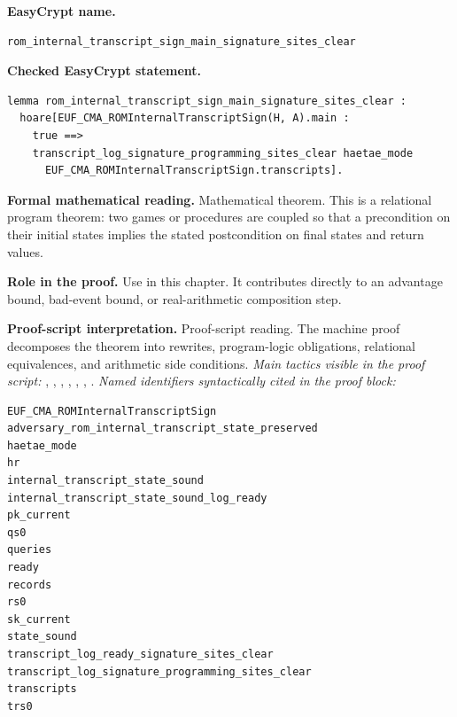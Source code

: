 \begin{formaltheorem}
\noindent\textbf{EasyCrypt name.}
\begin{lstlisting}[language=EasyCrypt,basicstyle=\ttfamily\scriptsize]
rom_internal_transcript_sign_main_signature_sites_clear
\end{lstlisting}
\noindent\textbf{Checked EasyCrypt statement.}
\begin{lstlisting}[language=EasyCrypt,basicstyle=\ttfamily\scriptsize]
lemma rom_internal_transcript_sign_main_signature_sites_clear :
  hoare[EUF_CMA_ROMInternalTranscriptSign(H, A).main :
    true ==>
    transcript_log_signature_programming_sites_clear haetae_mode
      EUF_CMA_ROMInternalTranscriptSign.transcripts].
\end{lstlisting}
\noindent\textbf{Formal mathematical reading.}
Mathematical theorem. This is a relational program theorem: two games or procedures are coupled so that a precondition on their initial states implies the stated postcondition on final states and return values.

\noindent\textbf{Role in the proof.}
Use in this chapter. It contributes directly to an advantage bound, bad-event bound, or real-arithmetic composition step.

\noindent\textbf{Proof-script interpretation.}
Proof-script reading. The machine proof decomposes the theorem into rewrites, program-logic obligations, relational equivalences, and arithmetic side conditions.
\emph{Main tactics visible in the proof script:} , , , , , , .
\emph{Named identifiers syntactically cited in the proof block:}
\begin{lstlisting}[language=EasyCrypt,basicstyle=\ttfamily\scriptsize]
EUF_CMA_ROMInternalTranscriptSign
adversary_rom_internal_transcript_state_preserved
haetae_mode
hr
internal_transcript_state_sound
internal_transcript_state_sound_log_ready
pk_current
qs0
queries
ready
records
rs0
sk_current
state_sound
transcript_log_ready_signature_sites_clear
transcript_log_signature_programming_sites_clear
transcripts
trs0
\end{lstlisting}

\end{formaltheorem}

